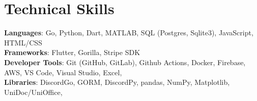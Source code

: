 \documentclass[letterpaper,11pt]{article}
\begin{document}
\section{Technical Skills}
 \begin{itemize}[leftmargin=0.15in, label={}]
    \small{\item{
     \textbf{Languages}{: Go, Python, Dart, MATLAB, SQL (Postgres, Sqlite3), JavaScript, HTML/CSS} \\
     \textbf{Frameworks}{: Flutter, Gorilla, Stripe SDK} \\
     \textbf{Developer Tools}{: Git (GitHub, GitLab), Github Actions, Docker, Firebase, AWS, VS Code, Visual Studio, Excel,} \\
     \textbf{Libraries}{: DiscordGo, GORM, DiscordPy, pandas, NumPy, Matplotlib, UniDoc/UniOffice, } \\
    }}
 \end{itemize}


\end{document}
